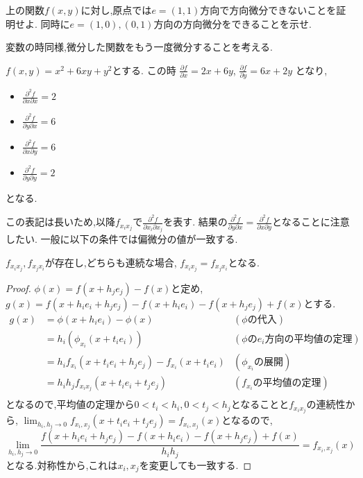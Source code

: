 \begin{exs}
上の関数$f(x,y)$に対し,原点では$e = (1, 1)$方向で方向微分できないことを証明せよ.
同時に$e =(1, 0), (0, 1)$方向の方向微分をできることを示せ.
\end{exs}

変数の時同様,微分した関数をもう一度微分することを考える.
\begin{epl}
$f(x, y) = x^2 + 6xy + y^2$とする.
この時
$\frac{\partial f}{\partial x} = 2x + 6y$,
$\frac{\partial f}{\partial y} = 6x + 2y$
となり,
\begin{itemize}
\item $\frac{\partial^2f}{\partial x \partial x} = 2$
\item $\frac{\partial^2f}{\partial y \partial x} = 6$
\item $\frac{\partial^2f}{\partial x \partial y} = 6$
\item $\frac{\partial^2f}{\partial y \partial y} = 2$
\end{itemize}
となる.
\end{epl}
この表記は長いため,以降$f_{x_ix_j}$で$\frac{\partial^2f}{\partial x_i \partial x_j}$を表す.
結果の$\frac{\partial^2f}{\partial y \partial x} = \frac{\partial^2f}{\partial x \partial y}$となることに注意したい.
一般に以下の条件では偏微分の値が一致する.

\begin{prop}
$f_{x_ix_j},f_{x_jx_i}$が存在し,どちらも連続な場合,
$f_{x_ix_j} = f_{x_jx_i}$となる.
\end{prop}
\begin{proof}
  $\phi(x) = f(x +h_je_j) - f(x)$と定め, $g(x)  = f(x+h_ie_i+h_je_j)- f(x+h_ie_i) - f(x+h_je_j) + f(x)$とする.
\begin{align*}
g(x) &= \phi(x+h_ie_i) - \phi(x) & (\phi \mbox{の代入})\\
     &= h_i(\phi_{x_i}(x+t_ie_i))  & (\phi \mbox{の}e_i\mbox{方向の平均値の定理})\\
     &= h_i f_{x_i}(x+t_ie_i+h_je_j) - f_{x_i}(x+t_ie_i)  & (\phi_{x_i}\mbox{の展開})\\
     &= h_ih_jf_{x_ix_j}(x+t_ie_i+t_je_j) & (f_{x_i}\mbox{の平均値の定理}) \\
\end{align*}
  となるので,平均値の定理から$0 < t_i<h_i,0 < t_j< h_j$となることと$f_{x_ix_j}$の連続性から,
  $\lim_{h_i,h_j \to 0}f_{x_i,x_j}(x+t_ie_i+t_je_j) = f_{x_i,x_j}(x)$となるので,
  \begin{equation*}
  \lim_{h_i, h_j \to 0} \frac{f(x+h_ie_i+h_je_j)- f(x+h_ie_i) - f(x+h_je_j) + f(x)}{h_ih_j} = f_{x_i,x_j}(x)
  \end{equation*}
  となる.対称性から,これは$x_i, x_j$を変更しても一致する.
\end{proof}


